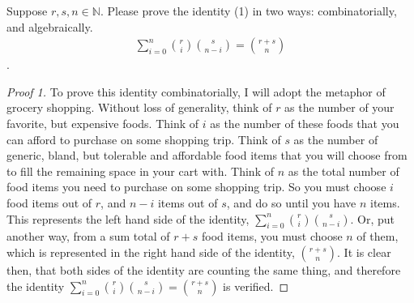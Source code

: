 \documentclass[12pt]{article}
\newcommand{\N}{\mathbb{N}}
\newcommand{\ds}{\displaystyle}
\newenvironment{problem}[2][Problem]{\begin{trivlist}
\item[\hskip \labelsep {\bfseries #1}\hskip \labelsep {\bfseries #2.}]}{\end{trivlist}}
\begin{document}
\newpage

\begin{problem}{2}
Suppose $r,s,n \in \N$.  Please prove the identity (1) in two ways: combinatorially, and algebraically.
\begin{eqnarray} \ds \sum_{i = 0}^n \binom{r}{i}\binom{s}{n-i} = \binom{r+s}{n} \label{Vandermonde} \end{eqnarray}.
\end{problem}

\begin{proof}[Proof 1]
To prove this identity combinatorially, I will adopt the metaphor of grocery shopping. Without loss of generality, think of $r$ as the number of your favorite, but expensive foods. Think of $i$ as the number of these foods that you can afford to purchase on some shopping trip. Think of $s$ as the number of generic, bland, but tolerable and affordable food items that you will choose from to fill the remaining space in your cart with. Think of $n$ as the total number of food items you need to purchase on some shopping trip. So you must choose $i$ food items out of $r$, and $n-i$ items out of $s$, and do so until you have $n$ items. This represents the left hand side of the identity, $\sum_{i = 0}^n \binom{r}{i}\binom{s}{n-i}$. Or, put another way, from a sum total of $r+s$ food items, you must choose $n$ of them, which is represented in the right hand side of the identity, $\binom{r+s}{n}$. It is clear then, that both sides of the identity are counting the same thing, and therefore the identity $\sum_{i = 0}^n \binom{r}{i}\binom{s}{n-i} = \binom{r+s}{n}$ is verified.
\end{proof}
\end{document}
